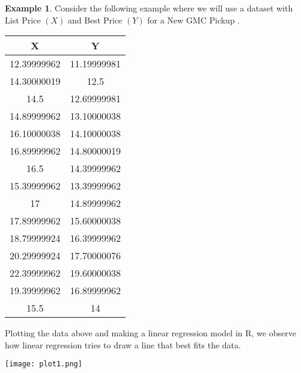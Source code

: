 \documentclass{article}[12pt]
\newcounter{example}[section]
\theoremstyle{definition}
\newtheorem{exmp}{Example}[section]
\begin{document}
\begin{exmp}
Consider the following example where we will use a dataset with List Price $(X)$ and Best Price $(Y)$ for a New GMC Pickup \cite{gmcdata}. 

\medskip

\begin{table}[!ht]
    \centering
    \begin{tabular}{|c|c|}
    \hline
        X & Y \\ \hline
        12.39999962 & 11.19999981 \\ 
        14.30000019 & 12.5 \\ 
        14.5 & 12.69999981 \\ 
        14.89999962 & 13.10000038 \\ 
        16.10000038 & 14.10000038 \\ 
        16.89999962 & 14.80000019 \\ 
        16.5 & 14.39999962 \\ 
        15.39999962 & 13.39999962 \\ 
        17 & 14.89999962 \\ 
        17.89999962 & 15.60000038 \\ 
        18.79999924 & 16.39999962 \\ 
        20.29999924 & 17.70000076 \\ 
        22.39999962 & 19.60000038 \\ 
        19.39999962 & 16.89999962 \\ 
        15.5 & 14 \\ \hline
    \end{tabular}
\end{table}

\end{exmp}

\newpage

\bigskip

\noindent
Plotting the data above and making a linear regression model in R, we observe how linear regression tries to draw a line that best fits the data.

\begin{center}
    \texttt{[image: plot1.png]}
\end{center}
\end{document}
